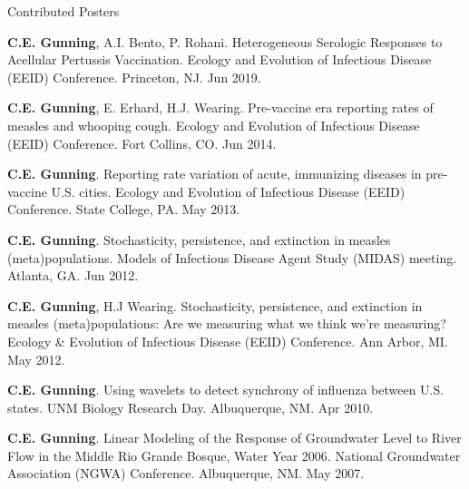\documentclass{resume} %
\begin{document}
\begin{rSection}{Contributed Posters}
\item {\bf C.E. Gunning}, A.I. Bento, P. Rohani.  
Heterogeneous Serologic Responses to Acellular Pertussis Vaccination.
Ecology and Evolution of Infectious Disease (EEID) Conference. Princeton, NJ. Jun 2019.
\item {\bf C.E. Gunning}, E. Erhard, H.J. Wearing.  Pre-vaccine era reporting
rates of measles and whooping cough. Ecology and Evolution of Infectious Disease
(EEID) Conference. Fort Collins, CO. Jun 2014. 
\item {\bf C.E. Gunning}. Reporting rate variation of acute, immunizing diseases in
pre-vaccine U.S. cities. Ecology and Evolution of Infectious Disease
(EEID) Conference. State College, PA. May 2013. 
\item {\bf C.E. Gunning}. Stochasticity, persistence, and extinction in measles
(meta)populations. Models of Infectious Disease Agent Study
(MIDAS) meeting. Atlanta, GA. Jun 2012. 
\item {\bf C.E. Gunning}, H.J Wearing. Stochasticity, persistence, and extinction in measles
(meta)populations: Are we measuring what we think we're
measuring? Ecology \& Evolution of Infectious Disease (EEID) Conference. Ann Arbor, MI. May 2012.
\item {\bf C.E. Gunning}. Using wavelets to detect synchrony of influenza between U.S.
states. UNM Biology Research Day. Albuquerque, NM.  Apr 2010. 
\item {\bf C.E. Gunning}. Linear Modeling of the Response of Groundwater Level to River Flow
in the Middle Rio Grande Bosque, Water Year 2006. National
Groundwater Association (NGWA) Conference. Albuquerque, NM. May 2007. 
\end{rSection}
\end{document}
